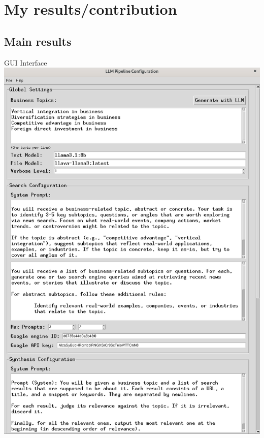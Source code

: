 \documentclass{beamer}
\begin{document}
\section{My results/contribution}
\subsection{Main results}
\begin{frame}{GUI Interface}
	\centering
	\includegraphics[height=.88\textheight]{../../deliverables/thesis/res/gui.png}
\end{frame}
\end{document}

